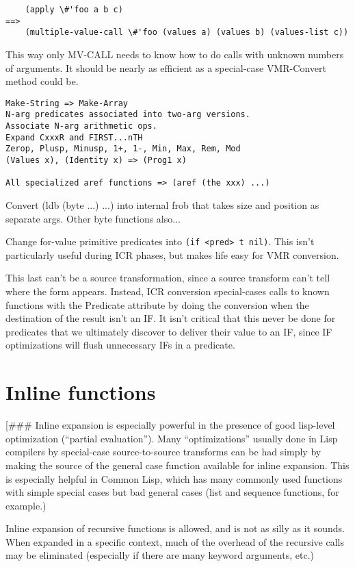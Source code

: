\begin{verbatim}
    (apply \#'foo a b c)
==>
    (multiple-value-call \#'foo (values a) (values b) (values-list c))
\end{verbatim}

This way only MV-CALL needs to know how to do calls with unknown numbers of
arguments.  It should be nearly as efficient as a special-case VMR-Convert
method could be.


\begin{verbatim}
Make-String => Make-Array
N-arg predicates associated into two-arg versions.
Associate N-arg arithmetic ops.
Expand CxxxR and FIRST...nTH
Zerop, Plusp, Minusp, 1+, 1-, Min, Max, Rem, Mod
(Values x), (Identity x) => (Prog1 x)

All specialized aref functions => (aref (the xxx) ...)
\end{verbatim}

Convert (ldb (byte ...) ...) into internal frob that takes size and position as
separate args.  Other byte functions also...

Change for-value primitive predicates into \verb+(if <pred> t nil)+.  This isn't
particularly useful during ICR phases, but makes life easy for VMR conversion.


This last can't be a source transformation, since a source transform can't tell
where the form appears.  Instead, ICR conversion special-cases calls to known
functions with the Predicate attribute by doing the conversion when the
destination of the result isn't an IF.  It isn't critical that this never be
done for predicates that we ultimately discover to deliver their value to an
IF, since IF optimizations will flush unnecessary IFs in a predicate.


\section{Inline functions}

[\#\#\# Inline expansion is especially powerful in the presence of good lisp-level
optimization (``partial evaluation'').  Many ``optimizations'' usually done in Lisp
compilers by special-case source-to-source transforms can be had simply by
making the source of the general case function available for inline expansion.
This is especially helpful in Common Lisp, which has many commonly used
functions with simple special cases but bad general cases (list and sequence
functions, for example.)

Inline expansion of recursive functions is allowed, and is not as silly as it
sounds.  When expanded in a specific context, much of the overhead of the
recursive calls may be eliminated (especially if there are many keyword
arguments, etc.)

